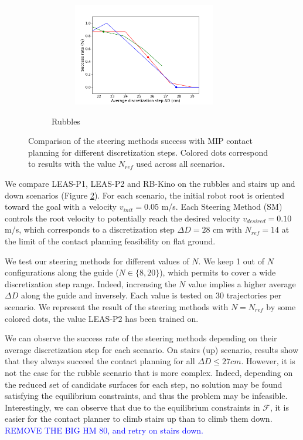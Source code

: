 \begin{figure}[h!]
\begin{subfigure}{0.9\linewidth}
\begin{subfigure}{0.48\linewidth}
        \end{subfigure}
        \begin{subfigure}{0.48\linewidth}
            \includegraphics[trim={0cm 0cm 2cm 1.8cm}, clip,width=\textwidth,height=4.5cm]{Figures/Chapter_MIP_SL1M/res_mip/MIP_res_rubbles/FIGURE_MIP_RUBBLES_2.png}
        \end{subfigure}
        \caption{Rubbles}
        \label{fig:mip:minimizing_basic:1}
    \end{subfigure}
    \caption{Comparison of the steering methods success with MIP contact planning for different discretization steps. Colored dots correspond to results with the value $N_{ref}$ used across all scenarios.}
    \label{fig:mip:minimizing_basic}
\end{figure}
We compare LEAS-P1, LEAS-P2 and RB-Kino on the rubbles and stairs up and down scenarios (Figure \ref{fig:mip:minimizing_basic}).
For each scenario, the initial robot root is oriented toward the goal with a velocity $v_{init}=0.05$ m/s.
Each Steering Method (SM) controls the root velocity to potentially reach the desired velocity $v_{desired}=0.10$ m/s, which corresponds to a discretization step $\Delta D=28$ cm with $N_{ref}=14$ at the limit of the contact planning feasibility on flat ground.

We test our steering methods for different values of $N$. 
We keep 1 out of $N$ configurations along the guide ($N \in \{8,20\}$), which permits to cover a wide discretization step range.
Indeed, increasing the $N$ value implies a higher average $\Delta D$ along the guide and inversely.
Each value is tested on 30 trajectories per scenario.
We represent the result of the steering methods with $N=N_{ref}$ by some colored dots, the value LEAS-P2 has been trained on.

We can observe the success rate of the steering methods depending on their average discretization step for each scenario.
On stairs (up) scenario, results show that they always succeed the contact planning for all $\Delta D \leq 27 cm$.
However, it is not the case for the rubble scenario that is more complex. Indeed, depending on the reduced set of candidate surfaces for each step, no solution may be found satisfying the equilibrium constraints, and thus the problem may be infeasible.
Interestingly, we can observe that due to the equilibrium constraints in $\mathcal{F}$, it is easier for the contact planner to climb stairs up than to climb them down. \textcolor{blue}{REMOVE THE BIG HM 80, and retry on stairs down.}

